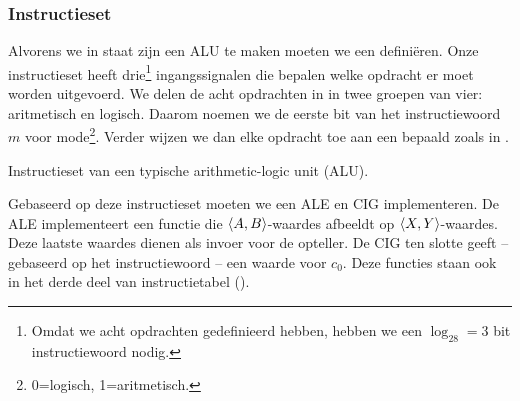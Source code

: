 \subsubsection{Instructieset}
Alvorens we in staat zijn een ALU te maken moeten we een  defini\"eren. Onze instructieset heeft drie\footnote{Omdat we acht opdrachten gedefinieerd hebben, hebben we een $\log_28=3$ bit instructiewoord nodig.} ingangssignalen die bepalen welke opdracht er moet worden uitgevoerd. We delen de acht opdrachten in in twee groepen van vier: aritmetisch en logisch. Daarom noemen we de eerste bit van het instructiewoord $m$ voor mode\footnote{0=logisch, 1=aritmetisch.}. Verder wijzen we dan elke opdracht toe aan een bepaald  zoals in .

\begin{table}[hbt]
\centering
{}
\caption{Instructieset van een typische arithmetic-logic unit (ALU).}
\end{table}

Gebaseerd op deze instructieset moeten we een ALE en CIG implementeren. De ALE implementeert een functie die $\left\langle A,B \right\rangle$-waardes afbeeldt op $\left\langle X,Y \right\rangle$-waardes. Deze laatste waardes dienen als invoer  voor de opteller. De CIG ten slotte geeft -- gebaseerd op het instructiewoord -- een waarde voor $c_0$. Deze functies staan ook in het derde deel van instructietabel ().

